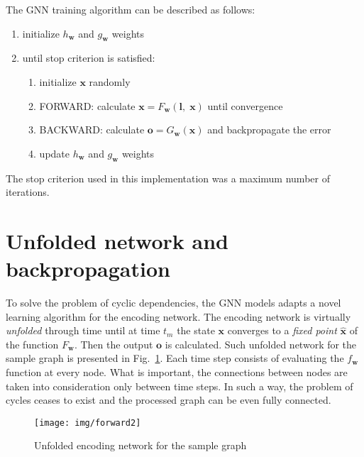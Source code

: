 \noindent The GNN training algorithm can be described as follows:
\begin{enumerate}
	\item initialize $h_{\bm{w}}$ and $g_{\bm{w}}$ weights
	\item until stop criterion is satisfied:
	\begin{enumerate}
		\item initialize $\bm{x}$ randomly
		\item FORWARD: calculate $\bm{x} = F_{\bm{w}}(\bm{l}, \; \bm{x})$ until convergence
		\item BACKWARD: calculate $\bm{o} = G_{\bm{w}}(\bm{x})$ and backpropagate the error
		\item update $h_{\bm{w}}$ and $g_{\bm{w}}$ weights
	\end{enumerate}
\end{enumerate}
\noindent The stop criterion used in this implementation was a maximum number of iterations.


\section{Unfolded network and backpropagation}
To solve the problem of cyclic dependencies, the GNN models adapts a novel learning algorithm for the encoding network. The encoding network is virtually \emph{unfolded} through time until at time $t_m$ the state $\bm{x}$ converges to a \emph{fixed point} $\hat{\bm{x}}$ of the function  $F_{\bm{w}}$. Then the output $\bm{o}$ is calculated. Such unfolded network for the sample graph is presented in Fig.~\ref{fig:gnn_forward}. Each time step consists of evaluating the $f_{\bm{w}}$ function at every node. What is important, the connections between nodes are taken into consideration only between time steps. In such a way, the problem of cycles ceases to exist and the processed graph can be even fully connected.

\begin{figure}[h!]
\begin{center}
	\texttt{[image: img/forward2]}
	\caption{Unfolded encoding network for the sample graph}
	\label{fig:gnn_forward}
\end{center}
\end{figure}

